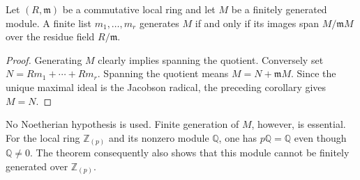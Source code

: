 \begin{corollary}\label{cor-local-generators-mod-maximal}
Let $(R,\mathfrak m)$ be a commutative local ring and let $M$ be a finitely generated module. A finite list $m_1,\ldots,m_r$ generates $M$ if and only if its images span $M/\mathfrak mM$ over the residue field $R/\mathfrak m$.
\end{corollary}
\begin{proof}\label{proof-local-generators-mod-maximal}
Generating $M$ clearly implies spanning the quotient. Conversely set $N=Rm_1+\cdots+Rm_r$. Spanning the quotient means $M=N+\mathfrak mM$. Since the unique maximal ideal is the Jacobson radical, the preceding corollary gives $M=N$.
\end{proof}

\begin{remark}\label{remark-nakayama-finiteness}
No Noetherian hypothesis is used. Finite generation of $M$, however, is essential. For the local ring $\mathbb Z_{(p)}$ and its nonzero module $\mathbb Q$, one has $p\mathbb Q=\mathbb Q$ even though $\mathbb Q\ne0$. The theorem consequently also shows that this module cannot be finitely generated over $\mathbb Z_{(p)}$.
\end{remark}
